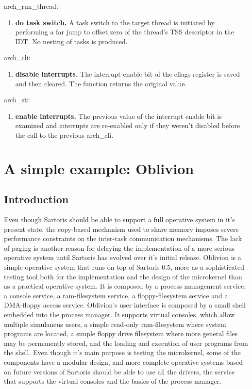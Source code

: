 \documentclass[11pt, letterpaper, twoside, english]{book}
\begin{document}
\textsf{arch\_run\_thread}: 
\begin{enumerate}
\item[]\textbf{do task switch.} A task switch to the target thread is initiated by performing a far jump to offset zero of the thread's TSS descriptor in the IDT. No nesting of tasks is produced.
\end{enumerate}

\textsf{arch\_cli}:
\begin{enumerate}
\item[]\textbf{disable interrupts.} The interrupt enable bit of the eflags register is saved and then cleared. The function returns the original value.
\end{enumerate}

\textsf{arch\_sti}:
\begin{enumerate}
\item[]\textbf{enable interrupts.} The previous value of the interrupt enable bit is examined and interrupts are re-enabled only if they weren't disabled before the call to the previous \textsf{arch\_cli}.
\end{enumerate}

\chapter{A simple example: Oblivion}

\section{Introduction}

Even though Sartoris should be able to support a full operative system in it's present state, the copy-based mechanism used to share memory imposes severe performance constraints on the inter-task communication mechanisms. The lack of paging is another reason for delaying the implementation of a more serious operative system until Sartoris has evolved over it's initial release. Oblivion is a simple operative system that runs on top of Sartoris 0.5, more as a sophisticated testing tool both for the implementation and the design of the microkernel than as a practical operative system. It is composed by a process management service, a console service, a ram-filesystem service, a floppy-filesystem service and a DMA-floppy access service. Oblivion's user interface is composed by a small shell embedded into the process manager. It supports virtual consoles, which allow multiple simulaneus users, a simple read-only ram-filesystem where system programs are located, a simple floppy drive filesystem where more general files may be permanently stored, and the loading and execution of user programs from the shell. Even though it's main purpose is testing the microkernel, some of the components have a modular design, and more complete operative systems based on future versions of Sartoris should be able to use all the drivers, the service that supports the virtual consoles and the basics of the process manager. 
\end{document}
